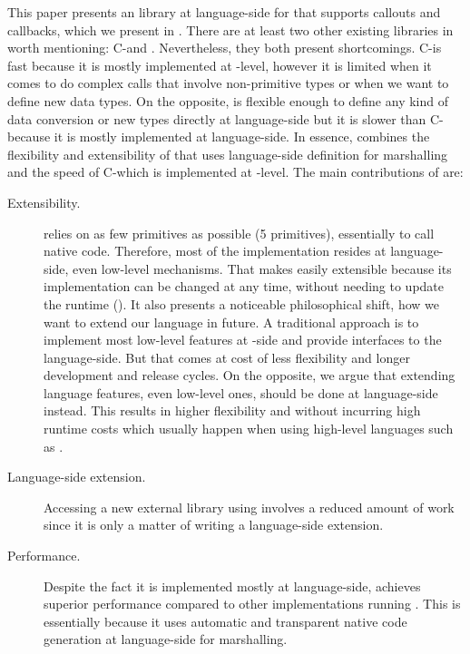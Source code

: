 

This paper presents  an \FFI library at language-side for \PH that supports callouts and callbacks, which we present in .
There are at least two other existing \FFI libraries in \PH worth mentioning: C-\FFI and \Alien.
Nevertheless, they both present shortcomings.
C-\FFI is fast because it is mostly implemented at \VM-level, however it is limited when it comes to do complex calls that involve non-primitive types or when we want to define new data types.
On the opposite, \Alien \FFI is flexible enough to define any kind of data conversion or new types directly at language-side but it is slower than C-\FFI because it is mostly implemented at language-side.
In essence, \NBFFI combines the flexibility and extensibility of \Alien that uses language-side definition for marshalling and the speed of C-\FFI which is implemented at \VM-level.
The main contributions of \NBFFI are:

\begin{description}
	\item[Extensibility.] \NBFFI relies on as few \VM primitives as possible (5 primitives), essentially to call native code. 
	Therefore, most of the implementation resides at language-side, even low-level mechanisms.
	That makes \NBFFI easily extensible because its implementation can be changed at any time, without needing to update the runtime (\VM).
	It also presents a noticeable philosophical shift, how we want to extend our language in future.
	A traditional approach is to implement most low-level features at \VM-side and provide interfaces to the language-side.
	But that comes at cost of less flexibility and longer development and release cycles.
	On the opposite, we argue that extending language features, even low-level ones, should be done at language-side instead.
	This results in higher flexibility and without incurring high runtime costs which usually happen when using high-level languages such as \ST.
	\item[Language-side extension.] Accessing a new external library using \NBFFI involves a reduced amount of work since it is only a matter of writing a language-side extension.
	\item[Performance.] Despite the fact it is implemented mostly at language-side, \NBFFI achieves superior performance compared to other \FFI implementations running \PH.
    This is essentially because it uses automatic and transparent native code generation at language-side for marshalling.
\end{description}

